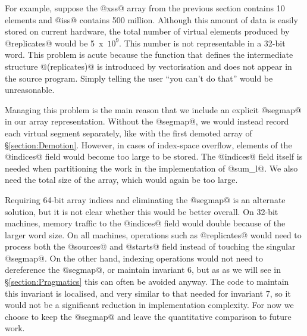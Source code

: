 For example, suppose the @xss@ array from the previous section contains 10 elements and  @iss@ contains 500 million. Although this amount of data is easily stored on current hardware, the total number of virtual elements produced by @replicates@ would be \mbox{5 x $10^9$}. This number is not representable in a 32-bit word. This problem is acute because the function that defines the intermediate structure @(replicates)@ is introduced by vectorisation and does not appear in the source program. Simply telling the user ``you can't do that'' would be unreasonable. 

Managing this problem is the main reason that we include an explicit @segmap@ in our array representation. Without the @segmap@, we would instead record each virtual segment separately, like with the first demoted array of \S\ref{section:Demotion}. However, in cases of index-space overflow, elements of the @indices@ field would become too large to be stored. The @indices@ field itself is needed when partitioning the work in the implementation of @sum_l@. We also need the total size of the array, which would again be too large.

Requiring 64-bit array indices and eliminating the @segmap@ is an alternate solution, but it is not clear whether this would be better overall. On 32-bit machines, memory traffic to the @indices@ field would double because of the larger word size. On all machines, operations such as @replicates@ would need to process both the @sources@ and @starts@ field instead of touching the singular @segmap@. On the other hand, indexing operations would not need to dereference the @segmap@, or maintain invariant 6, but as as we will see in \S\ref{section:Pragmatics} this can often be avoided anyway. The code to maintain this invariant is localised, and very similar to that needed for invariant 7, so it would not be a significant reduction in implementation complexity. For now we choose to keep the @segmap@ and leave the quantitative comparison to future work.


